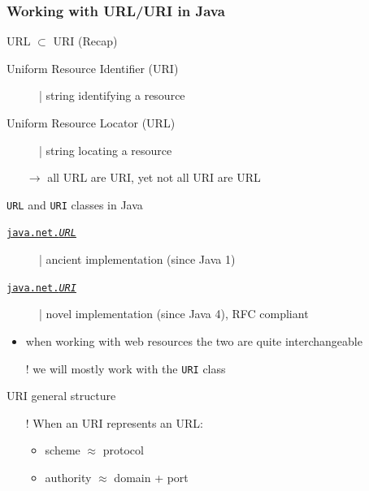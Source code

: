\documentclass[presentation]{beamer}\mode<presentation>{\usetheme{AMSBolognaFC}}
\begin{document}
\begin{frame}[allowframebreaks]
    \frametitle{Working with URL/URI in Java}

    \begin{block}{URL $\subset$ URI (Recap)}
        \begin{description}
            \item[Uniform Resource Identifier (URI)] | string \alert{identifying} a resource
            \item[Uniform Resource Locator (URL)] | string \alert{locating} a resource
        \end{description}
        \begin{itemize}
            \item[$\rightarrow$] all URL are URI, yet not all URI are URL
        \end{itemize}
    \end{block}

    \begin{block}{\texttt{URL} and \texttt{URI} classes in Java}
        \begin{description}
            \item[\href{https://docs.oracle.com/en/java/javase/15/docs/api/java.base/java/net/URL.html}{\texttt{java.net.\textit{URL}}}] | ancient implementation (since Java 1)
            \item[\href{https://docs.oracle.com/en/java/javase/15/docs/api/java.base/java/net/URI.html}{\texttt{java.net.\textit{URI}}}] | novel implementation (since Java 4), RFC compliant
        \end{description}
        \begin{itemize}
            \item when working with web resources the two are quite interchangeable
            \item[!] we will mostly work with the \texttt{URI} class
        \end{itemize}
    \end{block}

    \begin{block}{URI general structure}
        \begin{center}\ttfamily
            [scheme:][//authority][path][?query][\#fragment]
        \end{center}

        \begin{itemize}
            \item[!] When an URI represents an URL:
            \begin{itemize}
                \item scheme $\approx$ protocol
                \item authority $\approx$ domain + port
            \end{itemize}
        \end{itemize}
    \end{block}


\end{frame}
\end{document}
